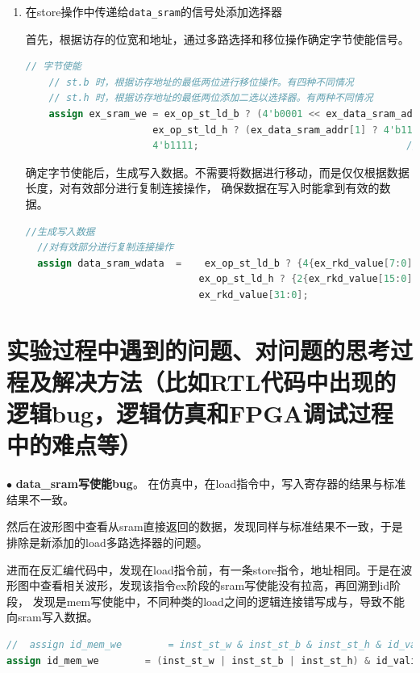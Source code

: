 \documentclass[11pt]{article}
\begin{document}
\begin{enumerate}
  \item 在store操作中传递给\verb|data_sram|的信号处添加选择器
  
  首先，根据访存的位宽和地址，通过多路选择和移位操作确定字节使能信号。
  \begin{lstlisting}[language=verilog]
    // 字节使能
    // st.b 时，根据访存地址的最低两位进行移位操作。有四种不同情况
    // st.h 时，根据访存地址的最低两位添加二选以选择器。有两种不同情况
    assign ex_sram_we = ex_op_st_ld_b ? (4'b0001 << ex_data_sram_addr[1:0]) :           // st.b
                      ex_op_st_ld_h ? (ex_data_sram_addr[1] ? 4'b1100 : 4'b0011) :    // st.h
                      4'b1111;                                    // st.w
  \end{lstlisting}
  确定字节使能后，生成写入数据。不需要将数据进行移动，而是仅仅根据数据长度，对有效部分进行复制连接操作，
  确保数据在写入时能拿到有效的数据。
\begin{lstlisting}[language=verilog]
  //生成写入数据
  //对有效部分进行复制连接操作
  assign data_sram_wdata  =    ex_op_st_ld_b ? {4{ex_rkd_value[7:0]}}:
                              ex_op_st_ld_h ? {2{ex_rkd_value[15:0]}}:
                              ex_rkd_value[31:0];
\end{lstlisting}
\end{enumerate}




\vspace{1ex}

\section{实验过程中遇到的问题、对问题的思考过程及解决方法（比如RTL代码中出现的逻辑bug，逻辑仿真和FPGA调试过程中的难点等）}

\noindent
$\bullet$
\textbf{data_sram写使能bug}。
在仿真中，在load指令中，写入寄存器的结果与标准结果不一致。

然后在波形图中查看从sram直接返回的数据，发现同样与标准结果不一致，于是排除是新添加的load多路选择器的问题。

进而在反汇编代码中，发现在load指令前，有一条store指令，地址相同。于是在波形图中查看相关波形，发现该指令ex阶段的sram写使能没有拉高，再回溯到id阶段，
发现是mem写使能中，不同种类的load之间的逻辑连接错写成与，导致不能向sram写入数据。

\begin{lstlisting}[language=verilog]
//  assign id_mem_we        = inst_st_w & inst_st_b & inst_st_h & id_valid;  
assign id_mem_we        = (inst_st_w | inst_st_b | inst_st_h) & id_valid;  
\end{lstlisting}
\vspace{1ex}
\end{document}
